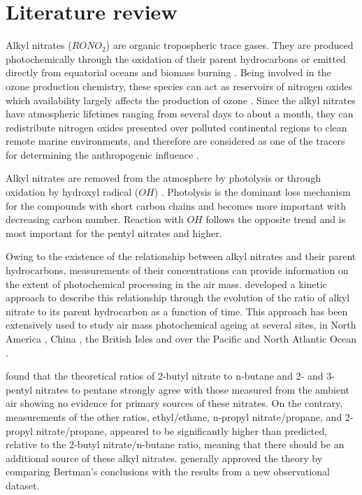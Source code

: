 \documentclass[11pt,a4paper]{article}
\begin{document}
\section{Literature review} \label{sec:data}
Alkyl nitrates ($RONO_2$) are organic tropospheric trace gases. They are produced photochemically through the oxidation of their parent hydrocarbons \citep{Roberts1990} or emitted directly from equatorial oceans \citep{Blake2003} and biomass burning \citep{Simpson2002}. Being involved in the ozone production chemistry, these species can act as reservoirs of nitrogen oxides which availability largely affects the production of ozone \citep{Reeves2007}. Since the alkyl nitrates have atmospheric lifetimes ranging from several days to about a month, they can redistribute nitrogen oxides presented over polluted continental regions to clean remote marine environments, and therefore are considered as one of the tracers for determining the anthropogenic influence \citep{Atherton1989, Reeves2007, Worton2005}.

Alkyl nitrates are removed from the atmosphere by photolysis \citep{Turberg1990} or through oxidation by hydroxyl radical ($OH$) \citep{Talukdar1997}. Photolysis is the dominant loss mechanism for the compounds with short carbon chains and becomes more important with decreasing carbon number. Reaction with $OH$ follows the opposite trend and is most important for the pentyl nitrates and higher.

Owing to the existence of the relationship between alkyl nitrates and their parent hydrocarbons, measurements of their concentrations can provide information on the extent of photochemical processing in the air mass. \cite{Bertman1995} developed a kinetic approach to describe this relationship through the evolution of the ratio of alkyl nitrate to its parent hydrocarbon as a function of time. This approach has been extensively used to study air mass photochemical ageing at several sites, in North America \citep{Bertman1995, Roberts1998}, China \citep{Simpson2006}, the British Isles \citep{Worton2010} and over the Pacific \citep{Simpson2003} and North Atlantic Ocean \citep{Reeves2007}.

\cite{Bertman1995} found that the theoretical ratios of  2-butyl nitrate to n-butane and 2- and 3-pentyl nitrates to pentane strongly agree with those measured from the ambient air showing no evidence for primary sources of these nitrates. On the contrary, measurements of the other ratios, ethyl/ethane, n-propyl nitrate/propane, and 2-propyl nitrate/propane, appeared to be significantly higher than predicted, relative to the 2-butyl nitrate/n-butane ratio, meaning that there should be an additional source of these alkyl nitrates. \cite{Roberts1998} generally approved the theory by comparing Bertman's conclusions with the results from a new observational dataset.
\end{document}
